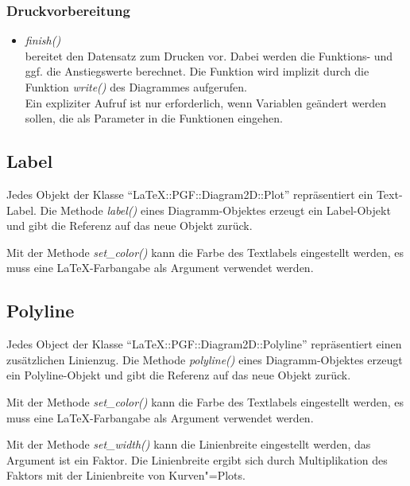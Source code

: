 \documentclass[ngerman,origlongtable]{scrartcl}
\begin{document}
\subsubsection{Druckvorbereitung}
\begin{itemize}
\item	\textit{finish()\/}\\
bereitet den Datensatz zum Drucken vor. Dabei werden die Funktions- und
ggf. die Anstiegswerte berechnet. Die Funktion wird implizit durch die
Funktion \textit{write()\/} des Diagrammes aufgerufen.\\
Ein expliziter Aufruf ist nur erforderlich, wenn Variablen geändert werden
sollen, die als Parameter in die Funktionen eingehen.
\end{itemize}
\clearpage
\subsection{Label}
Jedes Objekt der Klasse "`LaTeX::PGF::Diagram2D::Plot"' repräsentiert ein
Text-Label. Die Methode \textit{label()\/} eines Diagramm-Objektes
erzeugt ein Label-Objekt und gibt die Referenz auf das neue Objekt zurück.

Mit der Methode \textit{set\_color()\/} kann die Farbe des Textlabels eingestellt
werden, es muss eine \LaTeX{}-Farbangabe als Argument verwendet werden.
\clearpage
\subsection{Polyline}
Jedes Object der Klasse "`LaTeX::PGF::Diagram2D::Polyline"' repräsentiert
einen zusätzlichen Linienzug. Die Methode \textit{polyline()\/} eines
Diagramm-Objektes erzeugt ein Polyline-Objekt und gibt die Referenz auf das
neue Objekt zurück.

Mit der Methode \textit{set\_color()\/} kann die Farbe des Textlabels eingestellt
werden, es muss eine \LaTeX{}-Farbangabe als Argument verwendet werden.

Mit der Methode \textit{set\_width()\/} kann die Linienbreite eingestellt
werden, das Argument ist ein Faktor. Die Linienbreite ergibt sich durch
Multiplikation des Faktors mit der Linienbreite von Kurven"=Plots.
\clearpage
\end{document}
